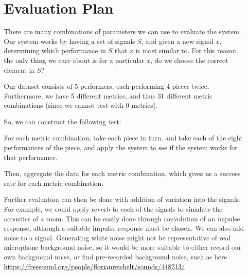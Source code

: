 \documentclass{article}
\begin{document}
\section*{Evaluation Plan}

There are many combinations of parameters we can use to evaluate the system. Our system works by having a set of signals $S$, and given a new signal $x$, determining which performance in $S$ that $x$ is most similar to. For this reason, the only thing we care about is for a particular $x$, do we choose the correct element in $S$?

Our dataset consists of 5 performers, each performing 4 pieces twice. Furthermore, we have 5 different metrics, and thus 31 different metric combinations (since we cannot test with 0 metrics).

So, we can construct the following test:

For each metric combination, take each piece in turn, and take each of the eight performances of the piece, and apply the system to see if the system works for that performance.

Then, aggregate the data for each metric combination, which gives us a success rate for each metric combination.

Further evaluation can then be done with addition of variation into the signals. For example, we could apply reverb to each of the signals to simulate the acoustics of a room. This can be easily done through convolution of an impulse response, although a suitable impulse response must be chosen. We can also add noise to a signal. Generating white noise might not be representative of real microphone background noise, so it would be more suitable to either record our own background noise, or find pre-recorded background noise, such as here \url{https://freesound.org/people/florianreichelt/sounds/448213/}
\end{document}
